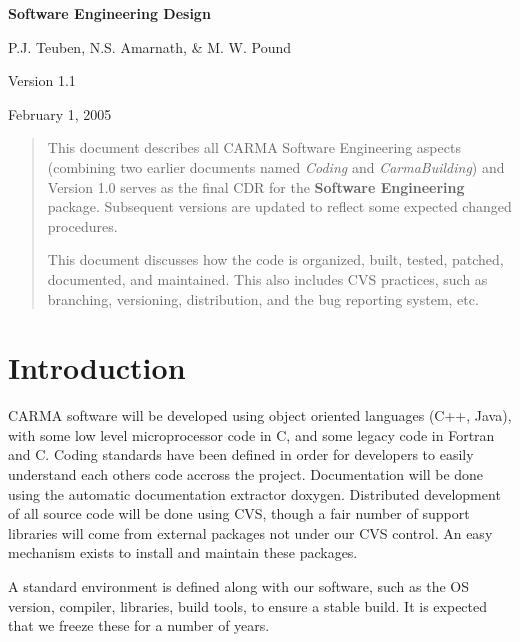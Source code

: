 \documentclass{article}
\begin{document}
% 
\newcommand{\SEP}[1]{\setlength{\fboxsep}{#1pt}}
\newsavebox{\Qbox}
\newenvironment{Question}{\hspace*{.1in}%
\begin{lrbox}{\Qbox}%
\begin{minipage}[t]{4in}\it\sffamily}%
{\end{minipage}%
\end{lrbox}\vspace{6pt}\SEP{6}%
\fbox{\usebox{\Qbox}}\vspace{6pt}\SEP{3}}
% 


\centerline{\Large {\bf Software Engineering Design}}
\centerline{P.J. Teuben, N.S. Amarnath, \& M. W. Pound}
\centerline{Version 1.1}
\centerline{February 1, 2005} 

\begin{abstract}

This document describes all CARMA Software Engineering aspects
(combining two earlier documents named {\it Coding} and
{\it CarmaBuilding}) and Version 1.0 serves as the final CDR for the
{\bf Software Engineering} package. Subsequent versions are updated
to reflect some expected changed procedures.

This document discusses how the code is organized, built, 
tested, patched, documented, and maintained.  
This also includes CVS practices, such as branching, versioning, 
distribution, and the bug reporting system, etc.

\end{abstract}



\section{Introduction}

CARMA software will be developed using object oriented languages (C++,
Java), with some low level microprocessor code in C, and some
legacy code in Fortran and C. Coding standards have been defined in
order for developers to easily understand each others code accross the
project. Documentation will be done using the automatic documentation
extractor doxygen.  Distributed development of all source
code will be done using CVS, though a fair number of support libraries
will come from external packages not under our CVS control. An easy
mechanism exists to install and maintain these packages.

A standard environment is defined along with our software, such 
as the OS version, compiler, libraries, build tools, to ensure a stable
build. It is expected that we freeze these for a number of years.
\end{document}
